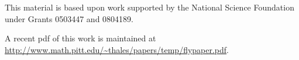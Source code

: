 \noindent

\bigskip\noindent
This material is based upon work supported by the National Science
Foundation under
Grants 0503447 and 0804189.

\bigskip\noindent\svninfo 

\bigskip\noindent
A recent pdf of this work is maintained at\hfill\break 
\url{http://www.math.pitt.edu/~thales/papers/temp/flypaper.pdf}.




\smallskip
\newpage

